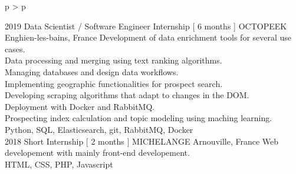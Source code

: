 \documentclass[cv]{cv_style}
\begin{document}
{\begin{tabular}{p{\leftsize\textwidth} > {\arraybackslash}p{\rightsize\textwidth}}
\begin{minipage}[t]{\rightsize\textwidth}
\begin{liste}
            \cventry
                {2019 \hspace{0.6cm}}   
                {Data Scientist / Software Engineer Internship [ 6 months ]
                }
                {OCTOPEEK}
                {Enghien-les-bains, France}
                {
                    Development of data enrichment tools for several use cases.\\
                    \rightchevron\hspace{.1cm} Data processing and merging using text ranking algorithms. \\
                    \rightchevron\hspace{.1cm} Managing databases and design data workflows. \\
                    \rightchevron\hspace{.1cm} Implementing geographic functionalities for prospect search. \\
                    \rightchevron\hspace{.1cm} Developing scraping algorithms that adapt to changes in the DOM.\\
                    \rightchevron\hspace{.1cm} Deployment with Docker and RabbitMQ.\\
                    \rightchevron\hspace{.1cm} Prospecting index calculation and topic modeling using maching learning. \\
                }
                {Python, SQL, Elasticsearch, git, RabbitMQ, Docker
                }
                \vspace{-0.2cm}\\
            \cventry
                {2018\hspace{0.6cm}} 
                {Short Internship [ 2 months ]}
                {MICHELANGE}
                {Arnouville, France}
                {
                    Web developement with mainly front-end developement. \\
                    }
		    {HTML, CSS, PHP, Javascript
                 }
        \end{liste} 



\end{minipage}
\end{tabular}}
\end{document}
